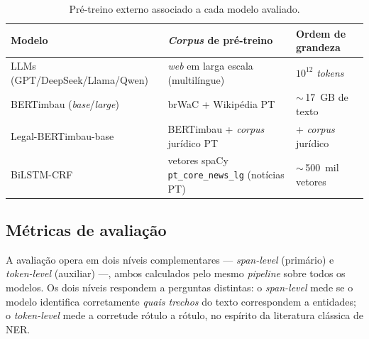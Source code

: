 \begin{table}[ht]
  \centering
  \small
  \caption{Pré-treino externo associado a cada modelo avaliado.}
  \label{tab:pretrain-corpora}
  \begin{tabular}{
    >{\raggedright\arraybackslash}p{4cm}
    >{\raggedright\arraybackslash}p{5.8cm}
    >{\raggedright\arraybackslash}p{3.6cm}
  }
    \toprule
    \textbf{Modelo} & \textbf{\textit{Corpus} de pré-treino} & \textbf{Ordem de grandeza} \\
    \midrule
    LLMs (GPT/DeepSeek/Llama/Qwen) & \textit{web} em larga escala (multilíngue) & $10^{12}$ \textit{tokens} \\
    BERTimbau (\textit{base}/\textit{large}) & brWaC + Wikipédia PT & $\sim$\,17~GB de texto \cite{Souza2020} \\
    Legal-BERTimbau-base & BERTimbau + \textit{corpus} jurídico PT & + \textit{corpus} jurídico \\
    BiLSTM-CRF & vetores spaCy \texttt{pt\_core\_news\_lg} (notícias PT) & $\sim$\,500~mil vetores \cite{honnibal2020spacy} \\
    \bottomrule
  \end{tabular}
\end{table}



\subsection{Métricas de avaliação}
\label{sec:metricas}

A avaliação opera em dois níveis complementares --- \textit{span-level} (primário) e \textit{token-level} (auxiliar) ---, ambos calculados pelo mesmo \textit{pipeline} sobre todos os modelos. Os dois níveis respondem a perguntas distintas: o \textit{span-level} mede se o modelo identifica corretamente \emph{quais trechos} do texto correspondem a entidades; o \textit{token-level} mede a corretude rótulo a rótulo, no espírito da literatura clássica de NER.

